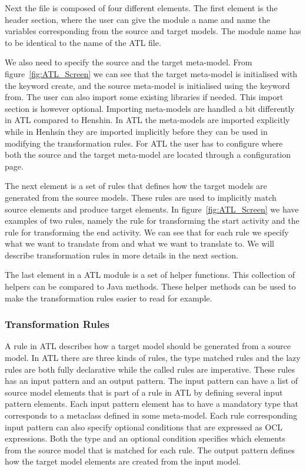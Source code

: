 Next the file is composed of four different elements. The first element is the
header section, where the user can give the module a name and name the variables
corresponding from the source and target models. The module name has to be
identical to the name of the ATL file.

We also need to specify the source and the target meta-model. From
figure~\ref{fig:ATL_Screen} we can see that the target meta-model is initialised 
with the keyword create, and the source meta-model is initialised using the
keyword from. The user can also import some existing libraries if needed. This
import section is however optional. Importing meta-models are handled a bit
differently in ATL compared to Henshin. In ATL the meta-models are imported
explicitly while in Henhsin they are imported implicitly before they can be used
in modifying the transformation rules. For ATL the user has to configure where
both the source and the target meta-model are located through a configuration
page. 

The next element is a set of rules that defines how the target models are
generated from the source models. These rules are used to implicitly match
source elements and produce target elements. In figure~\ref{fig:ATL_Screen} we
have examples of two rules, namely the rule for transforming the start activity
and the rule for transforming the end activity. We can see that for each rule we
specify what we want to translate from and what we want to translate to. We will
describe transformation rules in more details in the next section.

The last element in a ATL module is a set of helper functions. This collection
of helpers can be compared to Java methods. These helper methods can be used to
make the transformation rules easier to read for example.

\subsubsection*{Transformation Rules}

A rule in ATL describes how a target model should be generated from a source
model. In ATL there are three kinds of rules, the type matched rules and the
lazy rules are both fully declarative while the called rules are imperative.
These rules has an input pattern and an output pattern. The input pattern can
have a list of source model elements that is part of a rule in ATL by defining
several input pattern elements. Each input pattern element has to have a
mandatory type that corresponds to a metaclass defined in some meta-model. Each
rule corresponding input pattern can also specify optional conditions that are
expressed as OCL expressions. Both the type and an optional condition specifies
which elements from the source model that is matched for each rule. The output
pattern defines how the target model elements are created from the input model. 

